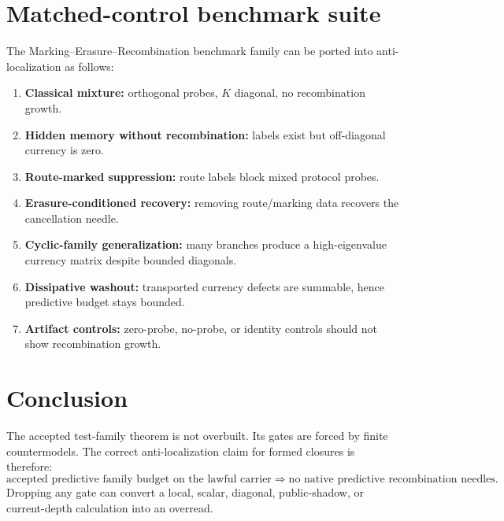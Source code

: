 \documentclass[11pt]{article}
\begin{document}
\section{Matched-control benchmark suite}
The Marking--Erasure--Recombination benchmark family can be ported into anti-localization as follows:
\begin{enumerate}[leftmargin=2em]
\item \textbf{Classical mixture:} orthogonal probes, \(K\) diagonal, no recombination growth.
\item \textbf{Hidden memory without recombination:} labels exist but off-diagonal currency is zero.
\item \textbf{Route-marked suppression:} route labels block mixed protocol probes.
\item \textbf{Erasure-conditioned recovery:} removing route/marking data recovers the cancellation needle.
\item \textbf{Cyclic-family generalization:} many branches produce a high-eigenvalue currency matrix despite bounded diagonals.
\item \textbf{Dissipative washout:} transported currency defects are summable, hence predictive budget stays bounded.
\item \textbf{Artifact controls:} zero-probe, no-probe, or identity controls should not show recombination growth.
\end{enumerate}

\section{Conclusion}
The accepted test-family theorem is not overbuilt.  Its gates are forced by finite countermodels.  The correct anti-localization claim for formed closures is therefore:
\[
\boxed{\text{accepted predictive family budget on the lawful carrier} \Rightarrow \text{no native predictive recombination needles}.}
\]
Dropping any gate can convert a local, scalar, diagonal, public-shadow, or current-depth calculation into an overread.
\end{document}
